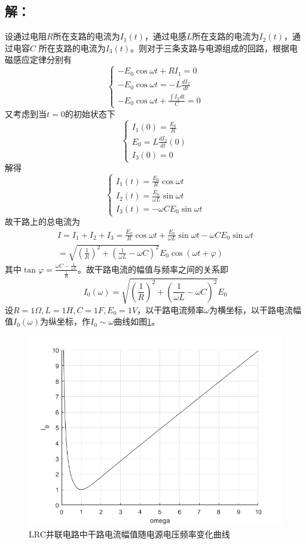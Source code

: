 \documentclass[10pt,a4paper]{article}
\theoremstyle{remark}
\begin{document}
\subsection{解：}
设通过电阻$R$所在支路的电流为$I_1(t)$，通过电感$L$所在支路的电流为$I_2(t)$，通过电容$C$ 所在支路的电流为$I_3(t)$。则对于三条支路与电源组成的回路，根据电磁感应定律分别有
\[
\left\{\begin{array}{l}
- E_0\cos \omega t + RI_1 = 0\\
- E_0\cos \omega t = - L\frac{dI_2}{dt}\\
- E_0\cos \omega t + \frac{\int I_3dt}{C} = 0
\end{array}\right.
\]
又考虑到当$t=0$的初始状态下
\[
\left\{\begin{array}{l}
I_1(0) = \frac{E_0}{R}\\
E_0 = L\frac{dI_2}{dt}(0)\\
I_3(0) = 0
\end{array}\right.
\]
解得
\[
\left\{\begin{array}{l}
I_1(t) = \frac{E_0}{R}\cos \omega t\\
I_2(t) = \frac{E_0}{\omega L}\sin \omega t\\
I_3(t) = -\omega CE_0\sin \omega t
\end{array}\right.
\]
故干路上的总电流为
\[
\begin{split}
I = I_1 + I_2 + I_3 = \frac{E_0}{R}\cos \omega t + \frac{E_0}{\omega L}\sin \omega t-\omega CE_0\sin \omega t\\
= \sqrt{(\frac{1}{R})^2+(\frac{1}{\omega L}-\omega C)^2}E_0\cos(\omega t + \varphi)
\end{split}
\]
其中$\tan\varphi = \frac{\omega C-\frac{1}{\omega L}}{\frac{1}{R}}$。故干路电流的幅值与频率之间的关系即
\[
I_0(\omega) = \sqrt{(\frac{1}{R})^2+(\frac{1}{\omega L}-\omega C)^2}E_0
\]
设$R = 1\Omega,L = 1H,C = 1F,E_0 = 1V$，以干路电流频率$\omega$为横坐标，以干路电流幅值$I_0(\omega)$为纵坐标，作$I_0\sim\omega$曲线如图\ref{I_0omega curve of LRC parallel connection circuit}。
\begin{figure}
\includegraphics[scale = 0.6]{Fig_1.png}
\caption{LRC并联电路中干路电流幅值随电源电压频率变化曲线}
\label{I_0omega curve of LRC parallel connection circuit}
\end{figure}
\end{document}
